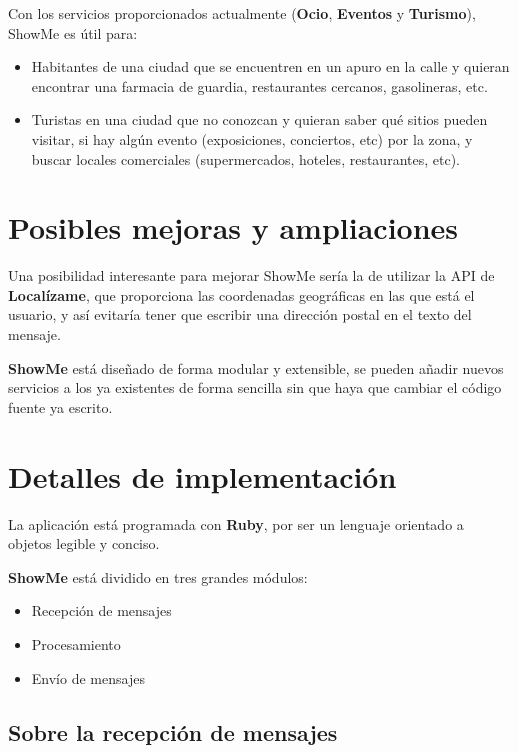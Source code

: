 \documentclass[11pt, a4paper, oneside]{article}
\begin{document}
Con los servicios proporcionados actualmente (\textbf{Ocio}, \textbf{Eventos} y \textbf{Turismo}), ShowMe es útil para:

\begin{itemize}
	\item Habitantes de una ciudad que se encuentren en un apuro en la calle y quieran encontrar una farmacia de guardia, restaurantes cercanos, gasolineras, etc.
	\item Turistas en una ciudad que no conozcan y quieran saber qué sitios pueden visitar, si hay algún evento (exposiciones, conciertos, etc) por la zona, y buscar locales comerciales (supermercados, hoteles, restaurantes, etc). 
\end{itemize}


\section{Posibles mejoras y ampliaciones} %
\label{sec:posibles_mejoras_y_ampliaciones}

Una posibilidad interesante para mejorar ShowMe sería la de utilizar la API de \textbf{Localízame}, que proporciona las coordenadas geográficas en las que está el usuario, y así evitaría tener que escribir una dirección postal en el texto del mensaje.

\textbf{ShowMe} está diseñado de forma modular y extensible, se pueden añadir nuevos servicios a los ya existentes de forma sencilla sin que haya que cambiar el código fuente ya escrito.

\section{Detalles de implementación} %
\label{sec:detalles_de_implementación}

La aplicación está programada con \textbf{Ruby}, por ser un lenguaje orientado a objetos legible y conciso.

\textbf{ShowMe} está dividido en tres grandes módulos:

\begin{itemize}
	\item Recepción de mensajes
	\item Procesamiento
	\item Envío de mensajes
\end{itemize}

\subsection{Sobre la recepción de mensajes}
\end{document}
